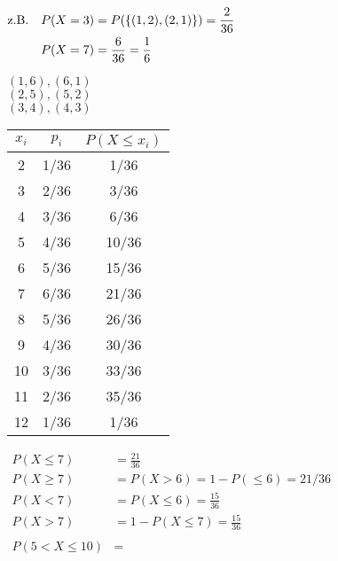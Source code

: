 $\begin{aligned}
\text{z.B.} \quad & P(X = 3) = P(\{(1,2), (2,1)\}) = \frac{2}{36}\\
						& P(X = 7) = \frac{6}{36} = \frac{1}{6}
\end{aligned}$

$(1,6) , (6,1)$\\
$(2,5), (5,2) $\\
$(3,4), (4,3)$ \\

\begin{tabular}{c | c | c}
$x_i$	&	$p_i$	&	$P(X \le x_i)$ \\
\hline
	2		&	1/36	&			1/36			\\
	3		&	2/36	&			3/36			\\	
	4		&	3/36	&			6/36			\\	
	5		&	4/36	&		 10/36			\\	
	6		&	5/36	&		 15/36			\\	
	7		&	6/36	&		 21/36			\\	
	8		&	5/36	&		 26/36			\\	
	9		&	4/36	&		 30/36			\\	
	10	&	3/36	&		 33/36			\\	
	11	&	2/36	&		 35/36			\\	
	12	&	1/36	&		  1/36			\\	
\end{tabular}

$\begin{aligned}
	P(X \leq 7) &= \frac{21}{36} \\
	P(X \geq 7) &= P(X > 6) = 1 - P(\leq 6) =  21/36 \\
	P(X < 7) &= P(X \leq 6) = \frac{15}{36} \\
	P(X > 7) &= 1 - P(X \leq 7) = \frac{15}{36} \\
	\\
	P(5 < X \leq 10) &= 
\end{aligned}$
